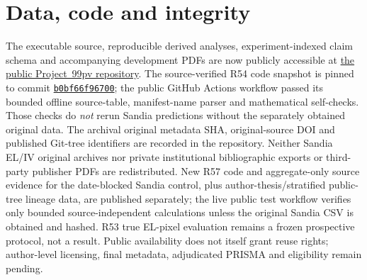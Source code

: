 \documentclass[10pt,a4paper]{article}
\begin{document}
\section*{Data, code and integrity}
The executable source, reproducible derived analyses, experiment-indexed claim schema and accompanying development PDFs are now publicly accessible at \href{https://github.com/shaikhamalkawi-ux/pv-imaging-validation-audit}{the public Project~99pv repository}. The source-verified R54 code snapshot is pinned to commit \href{https://github.com/shaikhamalkawi-ux/pv-imaging-validation-audit/commit/b0bf66f9670000297986569dab6de85d55bec822}{\texttt{b0bf66f96700}}; the public GitHub Actions workflow passed its bounded offline source-table, manifest-name parser and mathematical self-checks. Those checks do \emph{not} rerun Sandia predictions without the separately obtained original data. The archival original metadata SHA, original-source DOI and published Git-tree identifiers are recorded in the repository. Neither Sandia EL/IV original archives nor private institutional bibliographic exports or third-party publisher PDFs are redistributed. New R57 code and aggregate-only source evidence for the date-blocked Sandia control, plus author-thesis/stratified public-tree lineage data, are published separately; the live public test workflow verifies only bounded source-independent calculations unless the original Sandia CSV is obtained and hashed. R53 true EL-pixel evaluation remains a frozen prospective protocol, not a result. Public availability does not itself grant reuse rights; author-level licensing, final metadata, adjudicated PRISMA and eligibility remain pending. \cite{wilkinson2016}
\end{document}
